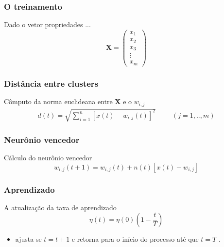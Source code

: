 \documentclass[10pt]{beamer} %
\begin{document}
\begin{frame}
	\frametitle{O treinamento}

\begin{block}{Dado o vetor propriedades ...}
 \begin{displaymath}
 \mathbf{X}=\left(\begin{array}{r}
x_{1}\\
x_{2}\\
x_{3}\\
  \vdots \\
x_{m}
 \end{array}\right)
 \label{inicio}
 \end{displaymath}
\end{block}
\end{frame}

\begin{frame}
	\frametitle{Distância entre clusters}
	\begin{block}{Cômputo da norma euclideana entre \textbf{X} e o  $w_{i,j}$}
		 \begin{eqnarray}
		 d(t)= \sqrt{\sum^{n}_{i=1}[x(t)-w_{i,j}(t)]^{2}} \hspace{1cm}  (j = {1,..,m}) 
		 \label{euclidiana}
		 \end{eqnarray}
	\end{block}
\end{frame}

\begin{frame}
	\frametitle{Neurônio vencedor}
	\begin{block}{Cálculo do neurônio vencedor}
	\begin{equation}
	w_{i,j}(t+1)=w_{i,j}(t)+n(t)[x(t)-w_{i,j}] 
	\label{ajuste de pesos}
	\end{equation}
	\end{block}
\end{frame}


\begin{frame}
	\frametitle{Aprendizado}
	\begin{block}{A atualização da taxa de aprendizado}
		\begin{equation}
		\eta(t)=\eta(0)    ( 1 -  \frac{t}{T}  )  
		\label{aprendizado}
		\end{equation}
	\end{block}
	\begin{itemize}
		\item ajusta-se $t=t+1$ e retorna para o início do processo até que $t=T$ \citep{YANG2009,Yan2014}.
	\end{itemize}
\end{frame}
\end{document}
